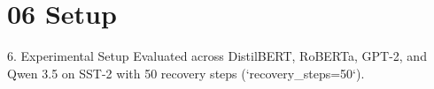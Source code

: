 \section{06 Setup}

 6. Experimental Setup
Evaluated across DistilBERT, RoBERTa, GPT-2, and Qwen 3.5 on SST-2 with 50 recovery steps (`recovery\_steps=50`).
